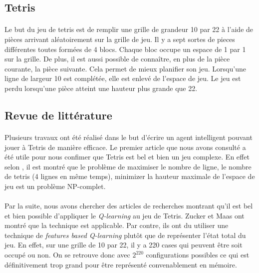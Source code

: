 \documentclass[a4paper, 12pt]{article} %
\begin{document}
    \subsection{Tetris}
    	\paragraph{}
	Le but du jeu de tetris est de remplir une grille de grandeur 10 par 22 à l'aide de pièces
	arrivant aléatoirement sur la grille de jeu. Il y a sept sortes de pieces différentes toutes 
	formées de 4 blocs. Chaque bloc occupe un espace de 1 par 1 sur la grille. De plus,
	il est aussi possible de connaître, en plus de la pièce courante, la pièce suivante. Cela
	permet de mieux planifier son jeu. Lorsqu'une ligne de largeur 10 est complétée, elle est enlevé
	de l'espace de jeu. Le jeu est perdu lorsqu'une pièce atteint une hauteur plus grande que 22.

    \subsection{Revue de littérature}
    	\paragraph{}
	Plusieurs travaux ont été réalisé dans le but d'écrire un agent intelligent pouvant jouer à Tetris
	de manière efficace. Le premier article que nous avons consulté a été utile pour nous confimer que
	Tetris est bel et bien un jeu complexe. En effet selon \cite{hard}, il est montré que le problème
	de maximiser le nombre de ligne, le nombre de tetris (4 lignes en même temps), minimizer la hauteur
	maximale de l'espace de jeu est un problème NP-complet.

    	\paragraph{}
	Par la suite, nous avons chercher des articles de recherches montrant qu'il est bel et bien possible
	d'appliquer le \textit{Q-learning} au jeu de Tetris. Zucker et Maas \cite{tetris} ont montré que
	la technique est applicable. Par contre, ils ont du utiliser une technique de \textit{features based Q-learning}
	plutôt que de représenter l'état total du jeu. En effet, sur une grille de 10 par 22, il y a 220 cases qui peuvent
	être soit occupé ou non. On se retrouve donc avec $2^{220}$ configurations possibles ce qui est définitivement
	trop grand pour être représenté convenablement en mémoire.
\end{document}
